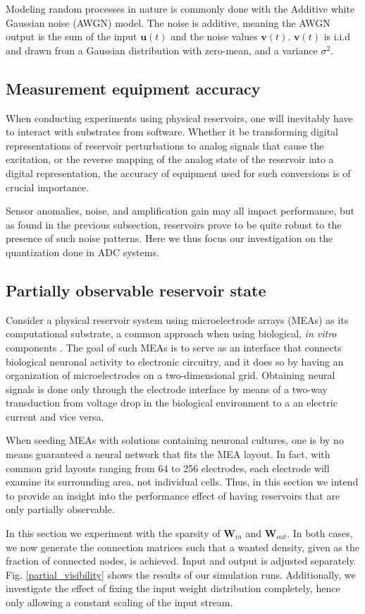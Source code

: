 Modeling random processes in nature is commonly done with the Additive white
Gaussian noise (AWGN) model. The noise is additive, meaning the AWGN output is
the sum of the input $\mathbf{u}(t)$ and the noise values
$\mathbf{v}(t)$. $\mathbf{v}(t)$ is i.i.d and drawn from a Gaussian distribution
with zero-mean, and a variance $\sigma^{2}$.

\subsection{Measurement equipment accuracy}

When conducting experiments using physical reservoirs, one will inevitably have
to interact with substrates from software. Whether it be transforming digital
representations of reservoir perturbations to analog signals that cause the
excitation, or the reverse mapping of the analog state of the reservoir into a
digital representation, the accuracy of equipment used for such conversions is
of crucial importance.

Sensor anomalies, noise, and amplification gain may all impact performance, but
as found in the previous subsection, reservoirs prove to be quite robust to the
presence of such noise patterns. Here we thus focus our investigation on the
quantization done in ADC systems.

\subsection{Partially observable reservoir state}

Consider a physical reservoir system using microelectrode arrays (MEAs) as its
computational substrate, a common approach when using biological, \textit{in
vitro} components \cite{aaser_towards_2017}. The goal of such MEAs is to serve
as an interface that connects biological neuronal activity to electronic
circuitry, and it does so by having an organization of microelectrodes on a
two-dimensional grid. Obtaining neural signals is done only through the
electrode interface by means of a two-way transduction from voltage drop in the
biological environment to a an electric current and vice versa.

When seeding MEAs with solutions containing neuronal cultures, one is by no
means guaranteed a neural network that fits the MEA layout. In fact, with common
grid layouts ranging from 64 to 256 electrodes, each electrode will examine its
surrounding area, not individual cells. Thus, in this section we intend to
provide an insight into the performance effect of having reservoirs that are
only partially observable.

In this section we experiment with the sparsity of $\mathbf{W}_{in}$ and
$\mathbf{W}_{out}$. In both cases, we now generate the connection matrices such
that a wanted density, given as the fraction of connected nodes, is
achieved. Input and output is adjusted separately. Fig. \ref{partial_visibility}
shows the results of our simulation runs. Additionally, we investigate the
effect of fixing the input weight distribution completely, hence only allowing a
constant scaling of the input stream.

